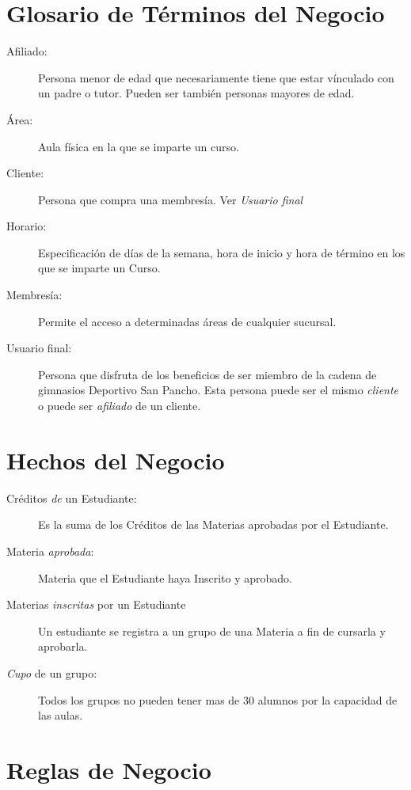\section{Glosario de Términos del Negocio}

\begin{description}
	\item[Afiliado: ] Persona menor de edad que necesariamente tiene que estar vínculado con un	
padre o tutor. Pueden ser también personas mayores de edad.	
	\item[Área:] Aula física en la que se imparte un curso.
	\item[Cliente:] Persona que compra una membresía. Ver {\em Usuario final}		
	\item[Horario:] Especificación de días de la semana, hora de inicio y hora de término en los que se imparte un Curso.	
	\item[Membresía:] Permite el acceso a determinadas áreas de cualquier sucursal.
	\item[Usuario final: ] Persona que disfruta de los beneficios de ser miembro de la cadena de gimnasios Deportivo San Pancho. Esta persona puede ser el mismo {\em cliente} o puede ser {\em afiliado} de un cliente.
\end{description}

\section{Hechos del Negocio}

\begin{description}
	\item[Créditos {\em de} un Estudiante:] Es la suma de los Créditos de las Materias aprobadas por el Estudiante.
	\item[Materia {\em aprobada}:] Materia que el Estudiante haya Inscrito y aprobado.
	\item[Materias {\em inscritas} por un Estudiante] Un estudiante se registra a un grupo de una Materia a fin de cursarla y aprobarla.
	\item[{\em Cupo} de un grupo:] Todos los grupos no pueden tener mas de 30 alumnos por la capacidad de las aulas.
\end{description}

\section{Reglas de Negocio}

